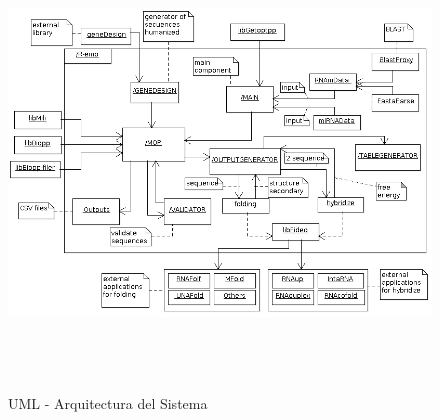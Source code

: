 \documentclass[12pt,a4paper,spanish]{article}
\begin{document}
\begin{figure}[!hbtp]
	\begin{center}
		\includegraphics[width=20cm, height=12cm, angle=90]{image/arquitecture.png}
		\caption{UML - Arquitectura del Sistema}
		\label{arquitecture}
	\end{center}
\end{figure}
\end{document}
